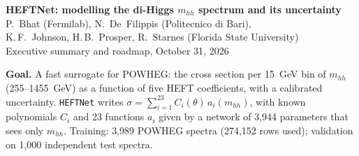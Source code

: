 
\pagestyle{plain}

\begin{center}
{\large\bfseries HEFTNet: modelling the di-Higgs $m_{hh}$ spectrum and its uncertainty}\\[2pt]
{\small P.~Bhat (Fermilab), N.~De~Filippis (Politecnico di Bari),\\
K.\,F.~Johnson, H.\,B.~Prosper, R.~Starnes (Florida State University)}\\[2pt]
{\small Executive summary and roadmap, October 31, 2026}
\end{center}
\vspace{-4pt}
\small
\noindent\textbf{Goal.} A fast surrogate for POWHEG: the cross section per 15~GeV bin of
$m_{hh}$ (255--1455~GeV) as a function of five HEFT coefficients, with a calibrated
uncertainty. \texttt{HEFTNet} writes $\sigma = \sum_{i=1}^{23} C_i(\theta)\,a_i(m_{hh})$, with
known polynomials $C_i$ and 23 functions $a_i$ given by a network of 3,944 parameters that
sees only $m_{hh}$. Training: 3,989 POWHEG spectra (274,152 rows used); validation on 1,000
independent test spectra.

